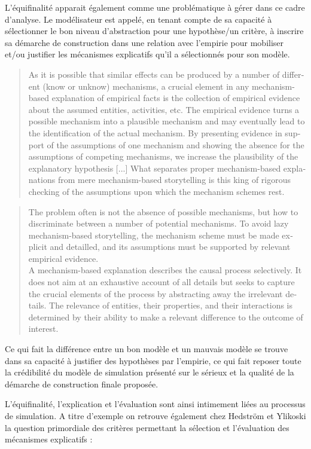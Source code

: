 L'équifinalité apparait également comme une problématique à gérer dans ce cadre d'analyse. Le modélisateur est appelé, en tenant compte de sa capacité à sélectionner le bon niveau d'abstraction pour une hypothèse/un critère, à inscrire sa démarche de construction dans une relation avec l'empirie pour mobiliser et/ou justifier les mécanismes explicatifs qu'il a sélectionnés pour son modèle.

\foreignblockquote{english}[\cite{Hedstrom2010}]{As it is possible that similar effects can be produced by a number of different (know or unknow) mechanisms, a crucial element in any mechanism-based explanation of empirical facts is the collection of empirical evidence about the assumed entities, activities, etc. The empirical evidence turns a possible mechanism into a plausible mechanism and may eventually lead to the identification of the actual mechanism. By presenting evidence in support of the assumptions of one mechanism and showing the absence for the assumptions of competing mechanisms, we increase the plausibility of the explanatory hypothesis [...] What separates proper mechanism-based explanations from mere mechanism-based storytelling is this king of rigorous checking of the assumptions upon which the mechanism schemes rest.}

\foreignblockquote{english}[\cite{Hedstrom2010}]{The problem often is not the absence of possible mechanisms, but how to discriminate between a number of potential mechanisms. To avoid lazy mechanism-based storytelling, the mechanism scheme must be made explicit and detailled, and its assumptions must be supported by relevant empirical evidence.\\
A mechanism-based explanation describes the causal process selectively. It does not aim at an exhaustive account of all details but seeks to capture the crucial elements of the process by abstracting away the irrelevant details. The relevance of entities, their properties, and their interactions is determined by their ability to make a relevant difference to the outcome of interest.}

Ce qui fait la différence entre un bon modèle et un mauvais modèle se trouve dans sa capacité à justifier des hypothèses par l'empirie, ce qui fait reposer toute la crédibilité du modèle de simulation présenté sur le sérieux et la qualité de la démarche de construction finale proposée.

L’équifinalité, l’explication et l’évaluation sont ainsi intimement liées au processus de simulation. A titre d’exemple on retrouve également chez Hedström et Ylikoski la question primordiale des critères permettant la sélection et l’évaluation des mécanismes explicatifs : 

